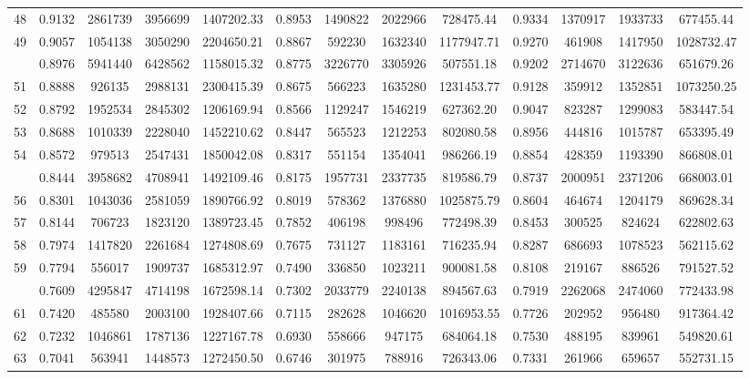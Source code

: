 \documentclass[
  12pt,
]{article}
\begin{document}
\begin{longtable}[t]{lcccccccccccc}
48 & 0.9132 & 2861739 & 3956699 & 1407202.33 & 0.8953 & 1490822 & 2022966 & 728475.44 & 0.9334 & 1370917 & 1933733 & 677455.44\\
49 & 0.9057 & 1054138 & 3050290 & 2204650.21 & 0.8867 & 592230 & 1632340 & 1177947.71 & 0.9270 & 461908 & 1417950 & 1028732.47\\
\addlinespace
50 & 0.8976 & 5941440 & 6428562 & 1158015.32 & 0.8775 & 3226770 & 3305926 & 507551.18 & 0.9202 & 2714670 & 3122636 & 651679.26\\
51 & 0.8888 & 926135 & 2988131 & 2300415.39 & 0.8675 & 566223 & 1635280 & 1231453.77 & 0.9128 & 359912 & 1352851 & 1073250.25\\
52 & 0.8792 & 1952534 & 2845302 & 1206169.94 & 0.8566 & 1129247 & 1546219 & 627362.20 & 0.9047 & 823287 & 1299083 & 583447.54\\
53 & 0.8688 & 1010339 & 2228040 & 1452210.62 & 0.8447 & 565523 & 1212253 & 802080.58 & 0.8956 & 444816 & 1015787 & 653395.49\\
54 & 0.8572 & 979513 & 2547431 & 1850042.08 & 0.8317 & 551154 & 1354041 & 986266.19 & 0.8854 & 428359 & 1193390 & 866808.01\\
\addlinespace
55 & 0.8444 & 3958682 & 4708941 & 1492109.46 & 0.8175 & 1957731 & 2337735 & 819586.79 & 0.8737 & 2000951 & 2371206 & 668003.01\\
56 & 0.8301 & 1043036 & 2581059 & 1890766.92 & 0.8019 & 578362 & 1376880 & 1025875.79 & 0.8604 & 464674 & 1204179 & 869628.34\\
57 & 0.8144 & 706723 & 1823120 & 1389723.45 & 0.7852 & 406198 & 998496 & 772498.39 & 0.8453 & 300525 & 824624 & 622802.63\\
58 & 0.7974 & 1417820 & 2261684 & 1274808.69 & 0.7675 & 731127 & 1183161 & 716235.94 & 0.8287 & 686693 & 1078523 & 562115.62\\
59 & 0.7794 & 556017 & 1909737 & 1685312.97 & 0.7490 & 336850 & 1023211 & 900081.58 & 0.8108 & 219167 & 886526 & 791527.52\\
\addlinespace
60 & 0.7609 & 4295847 & 4714198 & 1672598.14 & 0.7302 & 2033779 & 2240138 & 894567.63 & 0.7919 & 2262068 & 2474060 & 772433.98\\
61 & 0.7420 & 485580 & 2003100 & 1928407.66 & 0.7115 & 282628 & 1046620 & 1016953.55 & 0.7726 & 202952 & 956480 & 917364.42\\
62 & 0.7232 & 1046861 & 1787136 & 1227167.78 & 0.6930 & 558666 & 947175 & 684064.18 & 0.7530 & 488195 & 839961 & 549820.61\\
63 & 0.7041 & 563941 & 1448573 & 1272450.50 & 0.6746 & 301975 & 788916 & 726343.06 & 0.7331 & 261966 & 659657 & 552731.15\\

\end{longtable}
\end{document}
